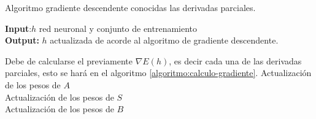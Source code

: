 \begin{algorithm}[H]
    \label{algoritmo:gradiente-descendente}
    \caption{Algoritmo gradiente descendente conocidas las derivadas parciales.}
    \hspace*{\algorithmicindent} \textbf{Input}:$h$ red neuronal  y conjunto de entrenamiento \\
    \hspace*{\algorithmicindent} \textbf{Output:} $h$ actualizada de acorde al algoritmo de gradiente descendente. 
    \begin{algorithmic}[1]
        \STATE Debe de calcularse el previamente $\nabla E(h)$, es decir cada una de las derivadas parciales, esto se hará en el algoritmo \ref{algoritmo:calculo-gradiente}.
        \STATE Actualización de los pesos de $A$ \\  
        \STATE Actualización de los pesos de $S$ \\   
        \STATE Actualización de los pesos de $B$ \\ 
\end{algorithmic}
\end{algorithm}

